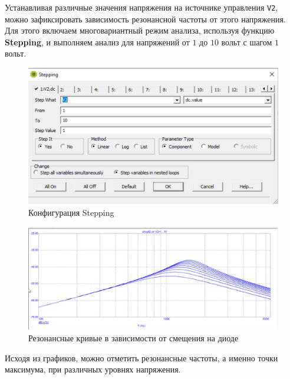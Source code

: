 Устанавливая различные значения напряжения на источнике управления \texttt{V2}, можно зафиксировать зависимость резонансной частоты от этого напряжения. Для этого включаем многовариантный режим анализа, используя функцию \textbf{Stepping}, и выполняем анализ для напряжений от $1$ до $10$ вольт с шагом $1$ вольт.
\begin{figure}[H]
	\centering
	\includegraphics[width=1\textwidth]{img/06.jpg}
	\captionsetup{font=footnotesize}
	\caption{Конфигурация Stepping}
	\label{fig:06}
\end{figure}

\begin{figure}[H]
	\centering
	\includegraphics[width=1\textwidth]{img/07.jpg}
	\captionsetup{font=footnotesize}
	\caption{Резонансные кривые в зависимости от смещения на диоде}
	\label{fig:07}
\end{figure}
Исходя из графиков, можно отметить резонансные частоты, а именно точки
максимума, при различных уровнях напряжения.


